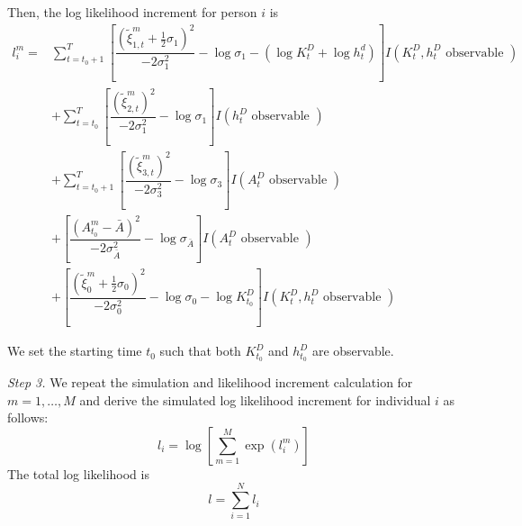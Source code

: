 \documentclass[\econtexRoot/ImaiKeane]{subfiles}
\begin{document}
Then, the log likelihood increment for person $i$ is
           \begin{equation*}
             \begin{split}
               l_i^m = & \sum_{t=t_0+1}^T \left[ \dfrac{(\tilde{\xi}_{1,t}^m+\frac{1}{2}\sigma_1)^2}{-2\sigma_1^2} - \log \sigma_1 - (\log K_t^D + \log h_t^d) \right] I(K_t^D, h_t^D \text{ observable }) \\
                       & + \sum_{t=t_0}^T \left[  \dfrac{(\tilde{\xi}_{2,t}^m)^2}{-2\sigma_1^2} - \log \sigma_1 \right] I(h_t^D \text{ observable }) \\
                       & + \sum_{t=t_0+1}^T \left[  \dfrac{(\tilde{\xi}_{3,t}^m)^2}{-2\sigma_3^2} - \log \sigma_3 \right] I(A_t^D \text{ observable }) \\
                       & + \left[ \dfrac{(A_{t_0}^m - \bar{A})^2}{-2 \sigma_{\bar{A}}^2} - \log \sigma_{\bar{A}} \right] I(A_t^D \text{ observable }) \\
               & + \left[ \dfrac{ ( \tilde{\xi}_0^m + \frac{1}{2} \sigma_0)^2}{-2 \sigma_0^2} - \log \sigma_0 - \log K_{t_0}^D \right] I(K_t^D, h_t^D \text{ observable })
        \end{split}
      \end{equation*} \par
      We set the starting time $t_0$ such that both $K_{t_0}^D$ and $h_{t_0}^D$ are observable. \par
      \noindent \textit{Step 3.}     We repeat the simulation and likelihood increment calculation for $m = 1, \dots , M$ and derive the simulated log likelihood increment for individual $i$ as follows:
      $$l_i = \log \left[ \sum_{m=1}^M \exp (l_i^m)\right]$$
  The total log likelihood is
  $$l = \sum_{i=1}^N l_i$$
      
  
\end{document}
